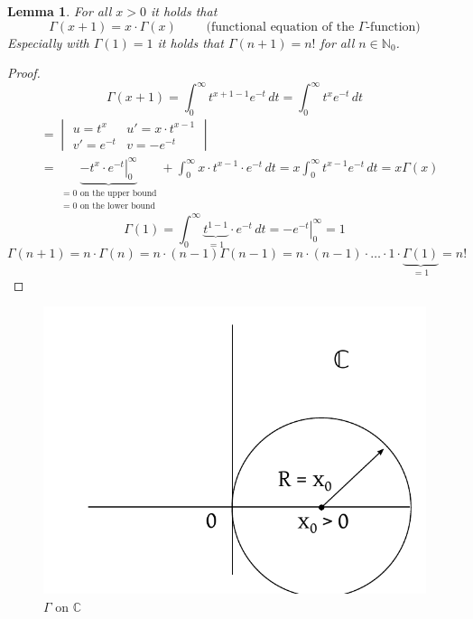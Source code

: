 \documentclass{article}
\newtheorem{lemma}{Lemma}  \numberwithin{lemma}{section}
\begin{document}
\begin{lemma} %
  \label{lemma13}
  For all $x > 0$ it holds that
  \[ \Gamma(x + 1) = x \cdot \Gamma(x) \qquad \text{ (functional equation of the $\Gamma$-function)} \]
  Especially with $\Gamma(1) = 1$ it holds that $\Gamma(n+1) = n!$ for all $n \in \mathbb N_0$.
\end{lemma}

\begin{proof}
  \[ \Gamma(x + 1) = \int_0^\infty t^{x+1-1} e^{-t} \, dt = \int_0^\infty t^{x} e^{-t} \, dt \]
  \begin{align*}
    &= \begin{vmatrix} u = t^x & u' = x \cdot t^{x-1} \\ v' = e^{-t} & v = -e^{-t} \end{vmatrix} \\
    &= \underbrace{\left. -t^x \cdot e^{-t} \right|_0^\infty}_{\substack{= 0 \text{ on the upper bound} \\ = 0 \text{ on the lower bound}}}
    + \int_0^\infty x \cdot t^{x-1} \cdot e^{-t} \, dt = x \int_0^\infty t^{x-1} e^{-t} \, dt = x \Gamma(x)
  \end{align*}
  \[ \Gamma(1) = \int_0^\infty \underbrace{t^{1-1}}_{=1} \cdot e^{-t} \, dt = \left. -e^{-t} \right|_0^\infty = 1 \]
  \[ \Gamma(n+1) = n \cdot \Gamma(n) = n \cdot (n - 1) \Gamma(n-1) = n \cdot (n-1) \cdot \ldots \cdot 1 \cdot \underbrace{\Gamma(1)}_{=1} = n! \]
\end{proof}

\begin{figure}[t]
  \begin{center}
    \includegraphics{img/22_gamma_on_C.pdf}
    \caption{$\Gamma$ on $\mathbb C$}
    \label{img:gamma}
  \end{center}
\end{figure}
\end{document}
